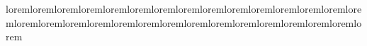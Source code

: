 loremloremloremloremloremloremloremloremloremloremloremloremloremloremloremloremloremloremloremloremloremloremloremloremloremloremloremloremloremlorem